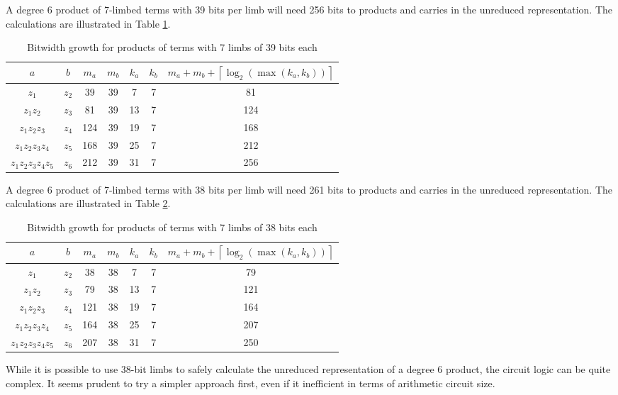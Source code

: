 \documentclass[a4paper, 12pt]{article}
\begin{document}
A degree 6 product of 7-limbed terms with 39 bits per limb will need 256 bits to products and carries in the unreduced representation. The calculations are illustrated in Table \ref{tab:limb39}.
\begin{table}[h]
  \centering
  \begin{tabular}{c|c|c|c|c|c|c}
    $a$ & $b$ & $m_a$ & $m_b$ & $k_a$ & $k_b$ & $m_a+m_b+\left\lceil \log_2 \left( \max\left( k_a, k_b \right) \right) \right\rceil$ \\ \hline
    $z_1$ & $z_2$ & 39 & 39 & 7 & 7 & 81 \\ \hline
    $z_1z_2$ & $z_3$ & 81 & 39 & 13 & 7 & 124 \\ \hline
    $z_1z_2z_3$ & $z_4$ & 124 & 39 & 19 & 7 & 168 \\ \hline
    $z_1z_2z_3z_4$ & $z_5$ & 168 & 39 & 25 & 7 & 212 \\ \hline
    $z_1z_2z_3z_4z_5$ & $z_6$ & 212 & 39 & 31 & 7 & 256 \\ \hline
  \end{tabular}
  \caption{Bitwidth growth for products of terms with 7 limbs of 39 bits each}
  \label{tab:limb39}
\end{table}

A degree 6 product of 7-limbed terms with 38 bits per limb will need 261 bits to products and carries in the unreduced representation. The calculations are illustrated in Table \ref{tab:limb38}.
\begin{table}[h]
  \centering
  \begin{tabular}{c|c|c|c|c|c|c}
    $a$ & $b$ & $m_a$ & $m_b$ & $k_a$ & $k_b$ & $m_a+m_b+\left\lceil \log_2 \left( \max\left( k_a, k_b \right) \right) \right\rceil$ \\ \hline
    $z_1$ & $z_2$ & 38 & 38 & 7 & 7 & 79 \\ \hline
    $z_1z_2$ & $z_3$ & 79 & 38 & 13 & 7 & 121 \\ \hline
    $z_1z_2z_3$ & $z_4$ & 121 & 38 & 19 & 7 & 164 \\ \hline
    $z_1z_2z_3z_4$ & $z_5$ & 164 & 38 & 25 & 7 & 207 \\ \hline
    $z_1z_2z_3z_4z_5$ & $z_6$ & 207 & 38 & 31 & 7 & 250 \\ \hline
  \end{tabular}
  \caption{Bitwidth growth for products of terms with 7 limbs of 38 bits each}
  \label{tab:limb38}
\end{table}

While it is possible to use 38-bit limbs to safely calculate the unreduced representation of a degree 6 product, the circuit logic can be quite complex. It seems prudent to try a simpler approach first, even if it inefficient in terms of arithmetic circuit size.
\end{document}
